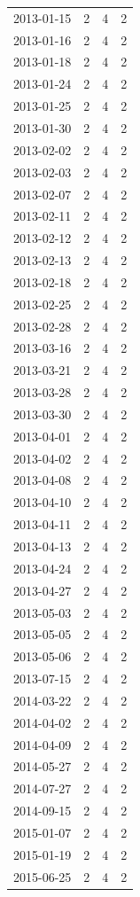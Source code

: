 \begin{tabular}{lrrr}
2013-01-15 & 2 & 4 & 2 \\
2013-01-16 & 2 & 4 & 2 \\
2013-01-18 & 2 & 4 & 2 \\
2013-01-24 & 2 & 4 & 2 \\
2013-01-25 & 2 & 4 & 2 \\
2013-01-30 & 2 & 4 & 2 \\
2013-02-02 & 2 & 4 & 2 \\
2013-02-03 & 2 & 4 & 2 \\
2013-02-07 & 2 & 4 & 2 \\
2013-02-11 & 2 & 4 & 2 \\
2013-02-12 & 2 & 4 & 2 \\
2013-02-13 & 2 & 4 & 2 \\
2013-02-18 & 2 & 4 & 2 \\
2013-02-25 & 2 & 4 & 2 \\
2013-02-28 & 2 & 4 & 2 \\
2013-03-16 & 2 & 4 & 2 \\
2013-03-21 & 2 & 4 & 2 \\
2013-03-28 & 2 & 4 & 2 \\
2013-03-30 & 2 & 4 & 2 \\
2013-04-01 & 2 & 4 & 2 \\
2013-04-02 & 2 & 4 & 2 \\
2013-04-08 & 2 & 4 & 2 \\
2013-04-10 & 2 & 4 & 2 \\
2013-04-11 & 2 & 4 & 2 \\
2013-04-13 & 2 & 4 & 2 \\
2013-04-24 & 2 & 4 & 2 \\
2013-04-27 & 2 & 4 & 2 \\
2013-05-03 & 2 & 4 & 2 \\
2013-05-05 & 2 & 4 & 2 \\
2013-05-06 & 2 & 4 & 2 \\
2013-07-15 & 2 & 4 & 2 \\
2014-03-22 & 2 & 4 & 2 \\
2014-04-02 & 2 & 4 & 2 \\
2014-04-09 & 2 & 4 & 2 \\
2014-05-27 & 2 & 4 & 2 \\
2014-07-27 & 2 & 4 & 2 \\
2014-09-15 & 2 & 4 & 2 \\
2015-01-07 & 2 & 4 & 2 \\
2015-01-19 & 2 & 4 & 2 \\
2015-06-25 & 2 & 4 & 2 \\

\end{tabular}
